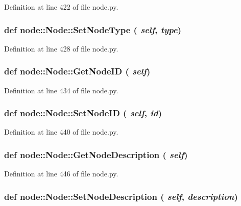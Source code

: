 Definition at line 422 of file node.py.\hypertarget{classnode_1_1Node_33a22d325064e662bd8c11a0ac8c59c3}{
\subsubsection[SetNodeType]{\setlength{\rightskip}{0pt plus 5cm}def node::Node::Set\-Node\-Type ( {\em self},  {\em type})}}
\label{classnode_1_1Node_33a22d325064e662bd8c11a0ac8c59c3}




Definition at line 428 of file node.py.\hypertarget{classnode_1_1Node_98806729923304d6714c82023eda0f93}{
\subsubsection[GetNodeID]{\setlength{\rightskip}{0pt plus 5cm}def node::Node::Get\-Node\-ID ( {\em self})}}
\label{classnode_1_1Node_98806729923304d6714c82023eda0f93}




Definition at line 434 of file node.py.\hypertarget{classnode_1_1Node_9fab825543cfcbcab07e988c5a353f3e}{
\subsubsection[SetNodeID]{\setlength{\rightskip}{0pt plus 5cm}def node::Node::Set\-Node\-ID ( {\em self},  {\em id})}}
\label{classnode_1_1Node_9fab825543cfcbcab07e988c5a353f3e}




Definition at line 440 of file node.py.\hypertarget{classnode_1_1Node_aa4d259f97c23b4e53a8b1280a5e2b86}{
\subsubsection[GetNodeDescription]{\setlength{\rightskip}{0pt plus 5cm}def node::Node::Get\-Node\-Description ( {\em self})}}
\label{classnode_1_1Node_aa4d259f97c23b4e53a8b1280a5e2b86}




Definition at line 446 of file node.py.\hypertarget{classnode_1_1Node_c71e316ad45f58b4e230e6d47ba8d607}{
\subsubsection[SetNodeDescription]{\setlength{\rightskip}{0pt plus 5cm}def node::Node::Set\-Node\-Description ( {\em self},  {\em description})}}
\label{classnode_1_1Node_c71e316ad45f58b4e230e6d47ba8d607}




